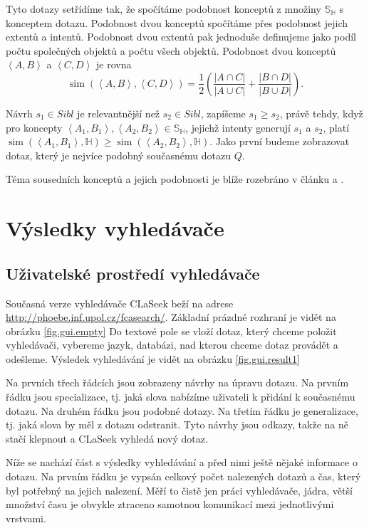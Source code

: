 \documentclass[12pt]{article}
\newcommand{\name}{CLaSeek}
\newcommand{\nameurl}{\url{http://phoebe.inf.upol.cz/fcasearch/}}
\newcommand{\ssection}[1]{\subsection{#1}}
\newcommand{\addk}[1]{\left(#1\right)}
\newcommand{\addsp}[1]{\left<#1\right>}
\DeclareMathOperator{\simfca}{sim}
\newcommand{\hledany}{\mathbb{H}}
\newcommand{\sibl}{\mathbb{S}}
\begin{document}
Tyto dotazy setřídíme tak, že spočítáme podobnost konceptů z množiny $\sibl_\hledany$ s konceptem dotazu. Podobnost dvou konceptů spočítáme přes podobnost jejich extentů a intentů. Podobnost dvou extentů pak jednoduše definujeme jako podíl počtu společných objektů a počtu všech objektů. Podobnost dvou konceptů $\addsp{A, B}$ a $\addsp{C, D}$ je rovna
$$
\simfca(\addsp{A, B}, \addsp{C, D}) = \frac12\addk{\frac{|A\cap C|}{|A\cup C|} + \frac{|B\cap D|}{|B\cup D|}}.
$$

Návrh $s_1\in Sibl$ je relevantnější než $s_2\in Sibl$, zapíšeme $s_1\ge s_2$, právě tehdy, když pro koncepty $\addsp{A_1, B_1}, \addsp{A_2, B_2} \in \sibl_\hledany$, jejichž intenty generují $s_1$ a $s_2$, platí $\simfca(\addsp{A_1, B_1}, \hledany)\ge\simfca(\addsp{A_2, B_2}, \hledany)$. Jako první budeme zobrazovat dotaz, který je nejvíce podobný současnému dotazu $Q$.

Téma sousedních konceptů a jejich podobnosti je blíže rozebráno v článku \cite{searchsleuth} a \cite{fcasim}.









\newpage
\section{Výsledky vyhledávače}

\ssection{Uživatelské prostředí vyhledávače}
Současná verze vyhledávače \name{} beží na adrese \nameurl. Základní prázdné rozhraní je vidět na obrázku \ref{fig.gui.empty} Do textové pole se vloží dotaz, který chceme položit vyhledávači, vybereme jazyk, databázi, nad kterou chceme dotaz provádět a odešleme. Výsledek vyhledávání je vidět na obrázku \ref{fig.gui.result1}

Na prvních třech řádcích jsou zobrazeny návrhy na úpravu dotazu. Na prvním řádku jsou specializace, tj. jaká slova nabízíme uživateli k přidání k současnému dotazu. Na druhém řádku jsou podobné dotazy. Na třetím řádku je generalizace, tj. jaká slova by měl z dotazu odstranit. Tyto návrhy jsou odkazy, takže na ně stačí klepnout a \name{} vyhledá nový dotaz. 

Níže se nachází část s výsledky vyhledávání a před nimi ještě nějaké informace o dotazu. Na prvním řádku je vypsán celkový počet nalezených dotazů a čas, který byl potřebný na jejich nalezení. Měří to čistě jen práci vyhledávače, jádra, větší množství času je obvykle ztraceno samotnou komunikací mezi jednotlivými vrstvami. 
\end{document}
